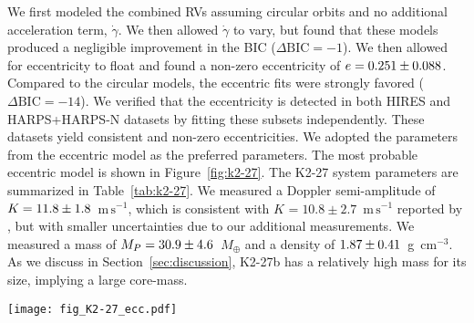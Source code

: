 \documentclass[preprint2]{aastex6}
\newcommand{\Mp}{\ensuremath{M_{P}}\xspace}
\newcommand{\ms}{\ensuremath{\mathrm{m}\,\mathrm{s}^{-1}}\xspace}
\newcommand{\Me}{\ensuremath{M_{\oplus}}\xspace}
\newcommand{\gcc}{g~cm$^{-3}$\xspace}
\newcommand{\dvdt}{\ensuremath{\dot{\gamma}}\xspace}
\newcommand{\K}[1]{\ensuremath{K_\mathrm{#1}}\xspace}
\newcommand{\dbic}{\ensuremath{\Delta\mathrm{BIC}}\xspace}
\begin{document}
We first modeled the combined RVs assuming circular orbits and no additional acceleration term, \dvdt. We then allowed \dvdt to vary, but found that these models produced a negligible improvement in the BIC ($\dbic=-1$). We then allowed for eccentricity to float and found a non-zero eccentricity of $e = \val{K2-27-ecc}{e1}$. Compared to the circular models, the eccentric fits were strongly favored ($\dbic=-14$). We verified that the eccentricity is detected in both HIRES and HARPS+HARPS-N datasets by fitting these subsets independently. These datasets yield consistent and non-zero eccentricities. We adopted the parameters from the eccentric model as the preferred parameters. The most probable eccentric model is shown in Figure~\ref{fig:k2-27}. The K2-27 system parameters are summarized in Table~\ref{tab:k2-27}. We measured a Doppler semi-amplitude of $\K{} = \val{K2-27-ecc}{k1}$~\ms, which is consistent with $\K{} = 10.8 \pm 2.7$~\ms reported by \cite{VanEylen16a}, but with smaller uncertainties due to our additional measurements. We measured a mass of $\Mp = \val{K2-27-ecc}{Mpsini1}$~\Me and a density of $\val{K2-27-ecc}{rhop1}$~\gcc. As we discuss in Section~\ref{sec:discussion}, K2-27b has a relatively high mass for its size, implying a large core-mass.  



\begin{figure*}
\centering
\texttt{[image: fig\_K2-27\_ecc.pdf]}
\caption{Single Keplerian model of K2-27 radial velocities (RVs), allowing for eccentricity (see Section~\ref{ssec:k2-27}). {\bf a)} Time series of RVs from HIRES along with HARPS and HARPS-N published in \cite{VanEylen16a}. During the fitting, we allowed for an arbitrary offset between the three instruments to float as a free parameter. The blue line shows the most probable Keplerian model. {\bf b)} Residuals to the most probable Keplerian model. {\bf c)} Phase-folded RVs and the most probable Keplerian.\label{fig:k2-27}}
\end{figure*}
\end{document}
